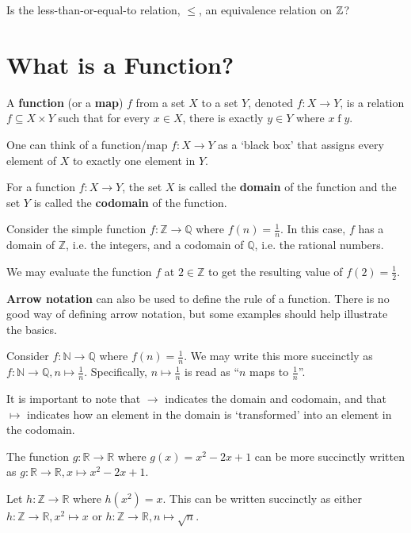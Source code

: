 \begin{exercise}
    Is the less-than-or-equal-to relation, $\leq$, an equivalence relation on $\mathbb{Z}$?
\end{exercise}

\section{What is a Function?}
\begin{definition}
    A \textbf{function} (or a \textbf{map}) $f$ from a set $X$ to a set $Y$, denoted $f: X \to Y$,  is a relation $f \subseteq X \times Y$ such that for every $x \in X$, there is exactly $y \in Y$ where $x\mathrel{f}y$.
\end{definition}
\begin{remark}
    One can think of a function/map $f:X\to Y$ as a `black box' that assigns every element of $X$ to exactly one element in $Y$.
\end{remark}
\begin{definition}
    For a function $f: X \to Y$, the set $X$ is called the \textbf{domain} of the function and the set $Y$ is called the \textbf{codomain} of the function.
\end{definition}
\begin{example}
    Consider the simple function $f: \mathbb{Z} \to \mathbb{Q}$ where $f(n) = \frac1n$. In this case, $f$ has a domain of $\mathbb{Z}$, i.e. the integers, and a codomain of $\mathbb{Q}$, i.e. the rational numbers.

    We may evaluate the function $f$ at $2 \in \mathbb{Z}$ to get the resulting value of $f(2) = \frac12$.
\end{example}

\textbf{Arrow notation} can also be used to define the rule of a function. There is no good way of defining arrow notation, but some examples should help illustrate the basics.
\begin{example}
    Consider $f: \mathbb{N} \to \mathbb{Q}$ where $f(n) = \frac1n$. We may write this more succinctly as $f: \mathbb{N} \to \mathbb{Q}, n \mapsto \frac1n$. Specifically, $n \mapsto \frac1n$ is read as ``$n$ maps to $\frac1n$''.
    
    It is important to note that $\to$ indicates the domain and codomain, and that $\mapsto$ indicates how an element in the domain is `transformed' into an element in the codomain.
\end{example}
\begin{example}
    The function $g: \mathbb{R} \to \mathbb{R}$ where $g(x) = x^2 - 2x + 1$ can be more succinctly written as $g: \mathbb{R} \to \mathbb{R}, x \mapsto x^2 - 2x + 1$.
\end{example}
\begin{example}
    Let $h: \mathbb{Z} \to \mathbb{R}$ where $h(x^2) = x$. This can be written succinctly as either $h: \mathbb{Z} \to \mathbb{R}, x^2 \mapsto x$ or $h: \mathbb{Z} \to \mathbb{R}, n \mapsto \sqrt n$.
\end{example}

